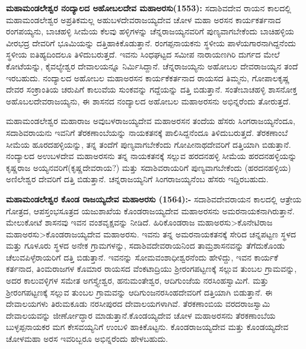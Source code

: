 \textbf{ಮಹಾಮಂಡಲೇಶ್ವರ ನಂದ್ಯಾಲದ ಅಹೋಬಲದೇವ ಮಹಾಅರಸು(1553):} ಸದಾಶಿವದೇವ ರಾಯನ ಕಾಲದಲ್ಲಿ ಮಹಾಮಂಡಲೇಶ್ವರ ಅಪ್ರತಿಕಮಲ್ಲ ಅಹುಬಳದೇವರಾಜಯ್ಯದೇವ ಚೋಳ ಮಹಾ ಅರಸನ ಕಾರ್ಯಕರ್ತನಾದ ರಂಗಪಯ್ಯನು, ಬಾಚಹಳ್ಳಿ ಸೀಮೆಯ ಕೆಲವು ಹಳ್ಳಿಗಳನ್ನು ಚೆನ್ನರಾಜಯ್ಯನವರಿಗೆ ಪುಣ್ಯವಾಗಬೇಕೆಂದು ಬಾಚಿಹಳ್ಳಿಯ ವೀರಭದ್ರ ದೇವರಿಗೆ ಭೂಮಿಯನ್ನು ದತ್ತಿಹಾಕಿಕೊಡುತ್ತಾನೆ. ರಂಗಪ್ಪನಾಯಕನು ಸ್ಥಳೀಯ ಪಾಳೆಯಗಾರನಾಗಿದ್ದನೆಂದು ಸ್ಥಳೀಯ ಐತಿಹ್ಯದಿಂದಲೂ ತಿಳಿದುಬರುತ್ತದೆ. ಇವನು ಸಿಂಧಘಟ್ಟದ ಸಮೀಪ ನಾರಾಯಣಗಿರಿ ದುರ್ಗದ ಮೇಲೆ ಕೋಟೆಯನ್ನು, ಕೈವಲ್ಯೇಶ್ವರ ದೇವಾಲಯನ್ನೂ ನಿರ್ಮಿಸಿದ್ದಾನೆ. ಚೆನ್ನರಾಜಯ್ಯನು ಅಹೋಬಲ ದೇವರಾಜಯ್ಯನ ತಂದೆ ಇರಬಹುದು. ನಂದ್ಯಾಲದ ಅಹೋಬಲ ಮಹಾಅರಸನ ಕಾರ್ಯಕೆಕರ್ತನಾದ ರಾಯಸದ ತಿಮ್ಮನು, ಗೋಪಾಲಕೃಷ್ಣ ದೇವರ ಸಂಕ್ರಾಂತಿಯ ಚರುಪಿಗೆ ಕಾಲುವೆಯ ಸುಂಕವನ್ನು ಗದ್ದೆಯನ್ನು ದತ್ತಿ ಬಿಡುತ್ತಾನೆ. ಸಂತೇಬಾಚಹಳ್ಳಿ ಶಾಸನೋಕ್ತ ಅಹೊಬಲದೇವರಾಜಯ್ಯನು, ಈ ಶಾಸನದ ನಂದ್ಯಾಲದ ಅಹೋಬಲ ಮಹಾಅರಸನು ಅಭಿನ್ನರೆಂದು ತೋರುತ್ತದೆ.

ಮಹಾಮಂಡಲೇಶ್ವರ ಮಹಾರಾಜ ಅವುಬಳರಾಜಯ್ಯದೇವ ಮಹಾಅರಸನ ತಂದೆಯ ಹೆಸರು ಸಿಂಗರಾಜಯ್ಯನೆಂದೂ, ಸದಾಶಿವರಾಯನು ಇವನಿಗೆ ತೆರಕಣಾಂಬೆಯನ್ನು ನಾಯಕತನಕ್ಕೆ ಪಾಲಿಸಿದ್ದನೆಂದೂ ತಿಳಿದುಬರುತ್ತದೆ. ತೆರಕಣಾಂಬೆ ಸೀಮೆಯ ಹೂರದಹಳ್ಳಿಯನ್ನು, ತನ್ನ ತಂದೆಗೆ ಪುಣ್ಯವಾಗಬೇಕೆಂದು ಗೋಪೀನಾಥದೇವರಿಗೆ ದತ್ತಿಯಾಗಿ ಬಿಡುತ್ತಾನೆ. ನಂದ್ಯಾಲದ ಅಉಬಳದೇವ ಮಹಾಅರಸನು ತನ್ನ ನಾಯಕತನಕ್ಕೆ ಸಲ್ಲುವ ಹರದನಹಳ್ಳಿ ಸೀಮೆಯ ಹರದನಹಳ್ಳಿಯನ್ನು ಕೃಷ್ಣರಾಜ ಅಯ್ಯನವರಿಗೆ(ಕೃಷ್ಣದೇವರಾಯ?) ಮತ್ತು ಸದಾಶಿವರಾಯರಿಗೆ ಪುಣ್ಯವಾಗಬೇಕೆಂದು (ಹರದನಹಳ್ಳಿಯ) ಅಣಿಲೇಶ್ವರ ದೇವರಿಗೆ ದತ್ತಿ ಬಿಡುತ್ತಾನೆ. ಚನ್ನರಾಜಯ್ಯನಿಗೆ ಸಿಂಗರಾಜಯ್ಯನೆಂಬ ಹೆಸರು ಇದ್ದಿರಬಹುದು.

\textbf{ಮಹಾಮಂಡಲೇಶ್ವರ ಕೊಂಡ ರಾಜಯ್ಯದೇವ ಮಹಾಅರಸು (1564):-} ಸದಾಶಿವದೇವರಾಯನ ಕಾಲದಲ್ಲಿ ಆತ್ರೇಯ ಗೋತ್ರದ, ಆಪಸ್ತಂಭಸೂತ್ರದ ಯಜುಶಾಖೆಯ ಕೊಂಡರಾಜಯ್ಯದೇವ ಮಹಾಅರಸನು ಅಮರನಾಯಕನಾಗಿರುತ್ತಾನೆ. ಮೇಲುಕೋಟೆ ಶಾಸನವು ಇವನ ವಂಶವೃಕ್ಷವನ್ನು ನೀಡಿದೆ. ಹಿರಿಕೊಂಡರಾಜ ಮಹಾಅರಸು\textgreater ಕೊನೇಟಿರಾಜ ಮಹಾಅರಸು\textgreater \break ಕೊಂಡರಾಜಯ್ಯದೇವ ಮಹಾಅರಸು. ಇವನು ತನ್ನ ಅಮರನಾಯಕತನಕ್ಕೆ ಸೇರಿದ ಚನ್ನಪಟ್ಟಣ ಸ್ಥಳದ ಮತ್ತು ಗೂಳೂರು ಸ್ಥಳದ ಅನೇಕ ಗ್ರಾಮಗಳನ್ನು, ಸದಾಶಿವದೇವರಾಯನಿಂದ ತಾಮ್ರಶಾಸನವನ್ನು ತೆಗೆದುಕೊಂಡು ಚೆಲುವಪಿಳ್ಳೆರಾಯರಿಗೆ ದತ್ತಿ ಬಿಡುತ್ತಾನೆ. ಇವನನ್ನು ಸೋಮವಂಶಾಧೀಶ್ವರನೆಂದು ಹೇಳಿದ್ದು, ಇವನ ಕಾರ್ಯಕೆ ಕರ್ತನಾದ, ತಿಂಮರಾಜಗಳ ಕೊಮಾರ ರಾಯಸದ ವೆಂಕಟಾದ್ರಿಯು ಶ‍್ರೀರಂಗಪಟ್ಟಣಕ್ಕೆ ಸಲ್ಲುವ ತುಂಬಲ ಗ್ರಾಮವನ್ನು, ಅದರ ಕಾಲುವಳ್ಳಿಗಳ ಸಮೇತ ಅಗಸ್ತ್ಯೇಶ್ವರ, ಹನುಮಂತೇಶ್ವರ, ಆದಿಗುಂಜೆಯ ನರಸಿಂಹಸ್ವಾಮಿಗೆ. ಮತ್ತು ಶ‍್ರೀರಂಗಪಟ್ಟಣಕ್ಕೆ ಸಲ್ಲುವ ತುಂಬಲ ಗ್ರಾಮವನ್ನು ಆದಿಗುಂಜನರಸಿಂಹದೇವರಿಗೆ ದತ್ತಿಯಾಗಿ ಬಿಡುತ್ತಾನೆ. ಈ ದೇವಾಲಯಗಳು ತಿರುಮಕೂಡು ನರಸೀಪುರದ ದೇವಾಲಯಗಳಾಗಿವೆ. ತೆರಕಣಾಂಬಿಯ ವರದರಾಜಸ್ವಾಮಿ ದೇವಾಲಯವನ್ನು ಜೀರ್ಣೋದ್ಧಾರ ಮಾಡುತ್ತಾನೆ.\break ಕೊಂಡಯ್ಯದೇವ ಚೋಳ ಮಹಾಅರಸನು ತೆರಕಣಾಂಬೆಯ ಬುಳ್ಳಪ್ಪನಾಯಕರ ಮಗ ಕೇಸವಯ್ಯನಿಗೆ ಉಂಬಳಿ ಹಾಕಿ\-ಕೊಟ್ಟನು. ಕೊಂಡರಾಜಯ್ಯದೇವ ಮತ್ತು ಕೊಂಡಯ್ಯದೇವ ಚೋಳಮಹಾ ಅರಸ ಇವರಿಬ್ಬರೂ ಅಭಿನ್ನರೆಂದು ಹೇಳಬಹುದು.

